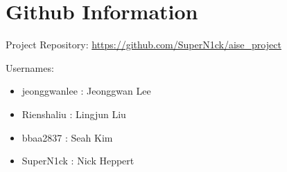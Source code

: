 \chapter{Github Information}

Project Repository: \href{https://github.com/SuperN1ck/aise_project}{https://github.com/SuperN1ck/aise\_project}

Usernames:
\begin{itemize}
	\item jeonggwanlee : Jeonggwan Lee
	\item Rienshaliu : Lingjun Liu
	\item bbaa2837 : Seah Kim
	\item SuperN1ck : Nick Heppert
\end{itemize}